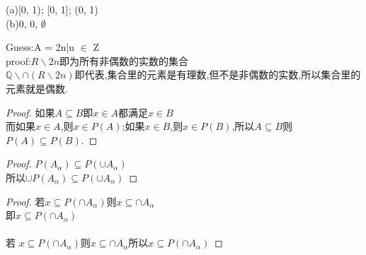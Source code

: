 \documentclass[a4paper, justified]{tufte-handout}
\begin{document}
\begin{solution}
\end{solution}

\begin{problem}[UD Problem 8.14]
\end{problem}

\begin{solution}
  (a)[0, 1); [0, 1]; (0, 1)\\
  (b)0, 0, $\emptyset$
\end{solution}

\begin{problem}[UD Problem 8.15]
\end{problem}

\begin{solution}
  Guess:A = {2n|n $\in$ Z}\\
  proof:$R\backslash {2n}$即为所有非偶数的实数的集合\\
  $\mathbb{Q} \backslash \cap(R\backslash {2n})$即代表,集合里的元素是有理数,但不是非偶数的实数,所以集合里的元素就是偶数.
\end{solution}

\begin{problem}[UD Problem 9.8]
\end{problem}

\begin{proof}
  如果$A \subseteq B$即$x \in A $都满足$x\in B$\\
  而如果$x \in A $,则$x \in P(A)$;如果$x \in B $,则$x \in P(B)$,所以$A \subseteq B$则$P(A) \subseteq P(B)$.
\end{proof}

\begin{problem}[UD Problem 9.9]
\end{problem}

\begin{proof}
  $P(A_\alpha ) \subseteq P(\cup A_\alpha )$\\
  所以$\cup P(A_\alpha ) \subseteq P(\cup A_\alpha )$
\end{proof}

\begin{problem}[UD Problem 9.10]
\end{problem}

\begin{proof}
  若$x \subseteq P(\cap A_\alpha )$则$x \subseteq \cap A_\alpha$\\
  即$x \subseteq P(\cap A_\alpha)$\\
  \\
  若 $x \subseteq P(\cap A_\alpha)$则$x \subseteq \cap A_\alpha$所以$x \subseteq P(\cap A_\alpha )$
\end{proof}
\end{document}
